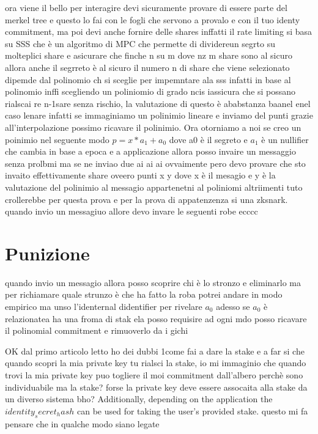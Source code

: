 ora viene il bello per interagire devi sicuramente provare di essere parte del merkel tree e questo lo fai con le fogli
che servono a provalo e con il tuo identy commitment, ma poi devi anche fornire delle shares inffatti il rate limiting
si basa su SSS che è un algoritmo di MPC che permette di dividereun segrto su molteplici share e asicurare che finche n
su m dove nz m share sono al sicuro allora anche il segrreto è al sicuro il numero n di share che viene selezionato
dipemde dal polinomio ch si sceglie per impemntare ala sss infatti in base al polinomio inffi scegliendo un poliniomio
di grado ncis iassicura che si possano rialscai re n-1sare senza rischio, la valutazione di questo è ababstanza baanel
enel caso lenare infatti se immaginiamo un polinimio lineare e inviamo del punti grazie all'interpolazione possimo
ricavare il polinimio. Ora otorniamo a noi se creo un poinimio nel seguente modo $p = x*a_1+a_0$ dove a0 è il segreto e
$a_1$ è un nullifier che cambia in base a epoca e a applicazione allora posso invaire un messaggio senza prolbmi ma se ne
inviao due ai ai ai ovvaimente pero devo provare che sto invaito effettivamente share oveero punti x y dove x è il
mesagio e y è la valutazione del polinimio al messagio appartenetni al poliniomi altriimenti tuto crollerebbe per questa
prova e per la prova di appatenzenza si una zksnark. quando invio un messagiuo allore devo invare le seguenti robe ecccc
\section{Punizione}
quando invio un messagio allora posso scoprire chi è lo stronzo e eliminarlo ma per richiamare quale strunzo è che ha
fatto la roba potrei andare in modo empirico ma unso l'identernal didentifier per rivelare $a_0$ adesso se $a_0$ è
relazionatea ha una froma di stak ela posso requisire ad ogni mdo posso ricavare il polinomial commitment e rimuoverlo
da i gichi

OK dal primo articolo letto ho dei dubbi 1come fai a dare la stake e a far si che quando scopri la mia private key tu
rialsci la stake, io mi immaginio che quando trovi la mia private key puo togliere il moi commitment dall'albero perchè
sono individuabile ma la stake? forse la private key deve essere assocaita alla stake da un diverso sistema bho?
Additionally, depending on the application the $identity_secret_hash$ can be used for taking the user’s provided stake.
questo mi fa pensare che in qualche modo siano legate




